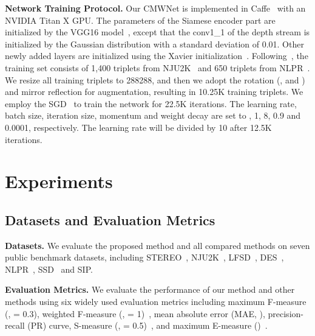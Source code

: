 \documentclass[runningheads]{llncs}
\begin{document}
\noindent\textbf{Network Training Protocol.}
Our CMWNet is implemented in Caffe~\cite{2014Caffe}
with an NVIDIA Titan X GPU.
The parameters of the Siamese encoder part are initialized by
the VGG16 model~\cite{2014VGG16ICLR}, except that the conv1\_1
of the depth stream is initialized by the Gaussian distribution with
a standard deviation of 0.01.
Other newly added layers are initialized using the
Xavier initialization~\cite{2010Xavier}.
Following~\cite{Han2018CTMF,Fan2019D3Net}, the training set
consists of 1,400 triplets from NJU2K~\cite{Ju2014NJU2K}
and 650 triplets from NLPR~\cite{Peng2014NLPR}.
We resize all training triplets to 288288, and then
we adopt the rotation (,  and )
and mirror reflection for augmentation, resulting in 10.25K training triplets.
We employ the SGD~\cite{2010SGD} to train the network for 22.5K
iterations.
The learning rate, batch size, iteration size, momentum and
weight decay are set to , 1, 8, 0.9 and 0.0001, respectively.
The learning rate will be divided by 10 after 12.5K iterations.





\section{Experiments}

\subsection{Datasets and Evaluation Metrics}
\noindent\textbf{Datasets.}
We evaluate the proposed method and all compared methods on seven public benchmark datasets,
including STEREO~\cite{Niu2012STEREO}, NJU2K~\cite{Ju2014NJU2K},
LFSD~\cite{Li2014LFSD}, DES~\cite{Cheng2014DES},
NLPR~\cite{Peng2014NLPR}, SSD~\cite{SSD2017}
and SIP\cite{Fan2019D3Net}.






\noindent\textbf{Evaluation Metrics.}
We evaluate the performance of our method and other methods using
six widely used evaluation metrics including
maximum F-measure (,  = 0.3),
weighted F-measure (,  = 1)~\cite{2014WeiFm},
mean absolute error (MAE, ),
precision-recall (PR) curve,
S-measure (,  = 0.5)~\cite{Fan2017Smeasure},
and maximum E-measure ()~\cite{Fan2018Emeasure}.
\end{document}
